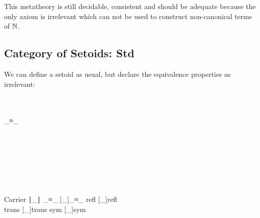 This metatheory is still decidable, consistent and should be adequate because the only axiom is irrelevant which can not be used to construct non-canonical terms of $\mathbb{N}$.

\subsection{Category of Setoids: \textbf{Std}}

We can define a setoid as usual, but declare the equivalence properties as irrelevant:

\begin{code}\>\<%
\\
\>  \AgdaSymbol{:}  \<%
\\
\>[0]\<[2]%
\>[2]  \_≈\_\<%
\\
\>[0]\<[2]%
\>[2]\<%
\\
\>[2]\<[4]%
\>[4] \AgdaSymbol{:} \<%
\\
\>[2]\<[4]%
\>[4] \<[12]%
\>[12]\AgdaSymbol{:}     \<%
\\
\>[2]\<[4]%
\>[4] \<[12]%
\>[12]\AgdaSymbol{:} \AgdaSymbol{\}}    \<%
\\
\>[2]\<[4]%
\>[4] \<[12]%
\>[12]\AgdaSymbol{:}  \AgdaSymbol{\}}        \<%
\\
\>[2]\<[4]%
\>[4] \<[12]%
\>[12]\AgdaSymbol{:}   \AgdaSymbol{\}}            \<%
\\
\>    \<[28]%
\>[28]\<%
\\
\>[4]\<[5]%
\>[5]\AgdaSymbol{(}Carrier  ∣\_∣ \AgdaSymbol{;} \_≈\_  [\_]\_≈\_ \AgdaSymbol{;} refl  [\_]refl\AgdaSymbol{;}\<%
\\
\>[5] trans  [\_]trans\AgdaSymbol{;} sym  [\_]sym\AgdaSymbol{)} \<[95]%
\>[95]\<%
\\
\>\<\end{code}

